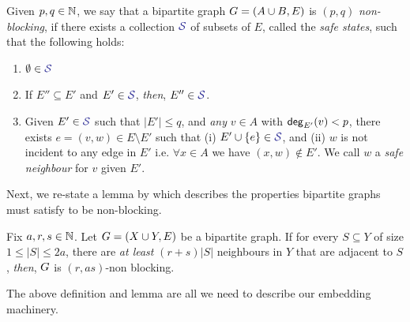 \documentclass[11pt]{article}
\begin{document}
\begin{definition}
Given $p,q \in \mathbb{N}$, we say that a bipartite graph $G = (A \cup B, E)$ is $(p, q)$ \emph{non-blocking}, if there exists a collection  $\Family{S}$ of subsets of $E$, called the \emph{safe states}, such that the following holds:

\begin{enumerate}
	\item $\emptyset \in \Family{S}$
	\item If $E'' \subseteq E'$ and $E' \in \Family{S}$, \emph{then}, $E'' \in \Family{S}$.
	\item Given $E' \in \Family{S}$ such that $|E'| \leq q$, and \emph{any} $v \in A$ with $\mathsf{deg}_{E'}(v) < p$, there exists $e = (v, w) \in E \setminus E'$  such that (i) $E' \cup \Set{e} \in \SafeStates $, and (ii) $w$ is not incident to any edge in $E'$ i.e. $\forall x \in A$ we have $(x,w) \notin E'$.
 We call $w$ a \emph{safe neighbour} for $v$ given $E'$.
\end{enumerate}

\end{definition}



Next, we re-state a lemma by \citep[Proposition 1]{feldman1988wide} which describes the properties bipartite graphs must satisfy to be non-blocking.

\begin{lemma}\label{lemma:condtions-for-non-block}
Fix $a, r, s \in \mathbb{N}$. Let $G = (X \cup Y, E)$ be a bipartite graph.
If for every $S \subseteq Y$ of size $1 \leq |S| \leq 2a$, there are \emph{at least} $(r + s)|S|$ neighbours in $Y$ that are adjacent to $S$, \emph{then}, $G$ is $(r, as)$-non blocking.
\end{lemma}

The above definition and lemma are all we need to describe our embedding machinery.
\end{document}
